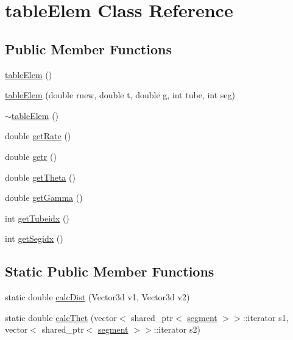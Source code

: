 \hypertarget{classtable_elem}{}\section{table\+Elem Class Reference}
\label{classtable_elem}
\subsection*{Public Member Functions}
\begin{DoxyCompactItemize}
\item 
\hyperlink{classtable_elem_a75fb37aa6dabd0ef445848198bcc2c77}{table\+Elem} ()
\item 
\hyperlink{classtable_elem_ace84fdbfe67610b96b5323fd6f961c24}{table\+Elem} (double rnew, double t, double g, int tube, int seg)
\item 
\hyperlink{classtable_elem_af1c904452d77b2972f6d0077dee68639}{$\sim$table\+Elem} ()
\item 
double \hyperlink{classtable_elem_a1db2b8266dc9c909a0fb6f18c8f7443c}{get\+Rate} ()
\item 
double \hyperlink{classtable_elem_a6ec9d74259c528e32b93d44a727e89ec}{getr} ()
\item 
double \hyperlink{classtable_elem_a5687c5c5d6d9c3c290c3fe0495de08ac}{get\+Theta} ()
\item 
double \hyperlink{classtable_elem_a92ca4eba0818cd4a3a042f46e3c55ad5}{get\+Gamma} ()
\item 
int \hyperlink{classtable_elem_a107266e6f04b912b159db92e85b4a070}{get\+Tubeidx} ()
\item 
int \hyperlink{classtable_elem_af8c5f321cc70ffbff3bbe8b2ddc81207}{get\+Segidx} ()
\end{DoxyCompactItemize}
\subsection*{Static Public Member Functions}
\begin{DoxyCompactItemize}
\item 
static double \hyperlink{classtable_elem_a4d6c2e62009c0aff199a23a72eb0db9c}{calc\+Dist} (Vector3d v1, Vector3d v2)
\item 
static double \hyperlink{classtable_elem_a0668fb1ba486bd13baf5e694b2aa5087}{calc\+Thet} (vector$<$ shared\+\_\+ptr$<$ \hyperlink{structsegment}{segment} $>$$>$\+::iterator s1, vector$<$ shared\+\_\+ptr$<$ \hyperlink{structsegment}{segment} $>$$>$\+::iterator s2)
\end{DoxyCompactItemize}


